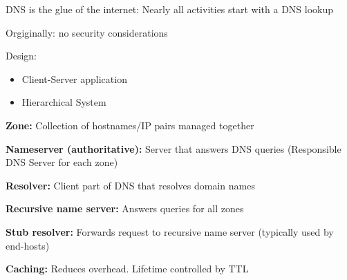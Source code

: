 \documentclass[fs, footer]{latex4ei}
\begin{document}
\begin{multicols*}{4}
{DNS is the glue of the internet: Nearly all activities start with a DNS lookup

Orgiginally: no security considerations

Design:
\begin{itemize}
	\item Client-Server application
	\item Hierarchical System
\end{itemize}

\textbf{Zone:} Collection of hostnames/IP pairs managed together

\textbf{Nameserver (authoritative): } Server that answers DNS queries (Responsible DNS Server for each zone)

\textbf{Resolver:} Client part of DNS that resolves domain names

\textbf{Recursive name server:}  Answers queries for all zones

\textbf{Stub resolver:} Forwards request to recursive name server (typically used by end-hosts)

\textbf{Caching:} Reduces overhead. Lifetime controlled by TTL
}
\end{multicols*}
\end{document}
